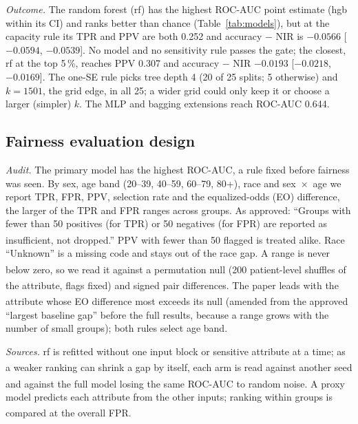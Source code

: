 \documentclass[conference]{IEEEtran}
\newcommand{\add}{\textsuperscript{\dag}}  %
\begin{document}
\emph{Outcome.} The random forest (rf) has the highest ROC-AUC point estimate (hgb within its
CI) and ranks better than chance (Table~\ref{tab:models}), but at the capacity rule its TPR and PPV
are both 0.252 and accuracy $-$ NIR is $-0.0566$ [$-0.0594$, $-0.0539$]. %
No model and no sensitivity rule passes the gate; the closest, rf at the top 5\,\%, reaches PPV
0.307 and accuracy $-$ NIR $-0.0193$ [$-0.0218$, $-0.0169$]. %
The one-SE rule picks tree depth 4 (20 of 25 splits; 5 otherwise) and $k = 1501$, the grid edge,
in all 25; a wider grid could only keep it or choose a larger (simpler) $k$. The MLP and
bagging extensions reach ROC-AUC 0.644. %

\subsection{Fairness evaluation design}
\emph{Audit.} The primary model has the highest ROC-AUC, a rule fixed before fairness was seen. By sex, age band (20--39, 40--59, 60--79, 80+), race and sex~$\times$~age we report
TPR, FPR, PPV, selection rate and the equalized-odds (EO) difference, the larger of the TPR and FPR
ranges across groups. As approved: ``Groups with fewer than 50 positives (for TPR) or 50 negatives
(for FPR) are reported as insufficient, not dropped.'' PPV with fewer than 50 flagged is treated
alike\add. Race ``Unknown'' is a missing code and stays out of the race gap. A range is never below
zero, so we read it against a permutation null\add{} (200 patient-level shuffles of the attribute,
flags fixed) and signed pair differences\add. %
The paper leads with the attribute whose EO difference most exceeds its null\add{} (amended from
the approved ``largest baseline gap'' before the full results, because a range grows with the
number of small groups); both rules select age band. %

\emph{Sources.} rf is refitted without one input block or sensitive attribute at a time; as a
weaker ranking can shrink a gap by itself, each arm is read against another seed\add{} and against
the full model losing the same ROC-AUC to random noise\add. A proxy model predicts each attribute
from the other inputs; ranking within groups is compared at the overall FPR\add.
\end{document}
